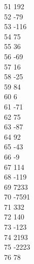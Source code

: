 { 51	192 \\
 52	-79 \\
 53	-116 \\
 54	75 \\
 55	36 \\
 56	-69 \\
 57	16 \\
 58	-25 \\
 59	84 \\
 60	6 \\
 61	-71 \\
 62	75 \\
 63	-87 \\
 64	92 \\
 65	-43 \\
 66	-9 \\
 67	114 \\
 68	-119 \\
 69	7233 \\
 70	-7591 \\
 71	332 \\
 72	140 \\
 73	-123 \\
 74	2193 \\
 75	-2223 \\
 76	78 \\
}
